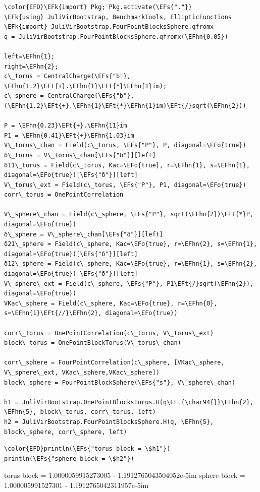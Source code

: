 \documentclass[a4paper]{article}
\numberwithin{equation}{section}
\newcommand{\EFs}[1]{\textcolor{EFs}{#1}} %
\newcommand{\EFk}[1]{\textcolor{EFk}{#1}} %
\newcommand{\EFt}[1]{\textcolor{EFt}{#1}} %
\newcommand{\EFo}[1]{\textcolor{EFo}{#1}} %
\newcommand{\EFhn}[1]{\textcolor{EFhn}{#1}} %
\begin{document}
\begin{Code}
\begin{Verbatim}
\color{EFD}\EFk{import} Pkg; Pkg.activate(\EFs{"."})
\EFk{using} JuliVirBootstrap, BenchmarkTools, EllipticFunctions
\EFk{import} JuliVirBootstrap.FourPointBlocksSphere.qfromx
q = JuliVirBootstrap.FourPointBlocksSphere.qfromx(\EFhn{0.05})

left=\EFhn{1};
right=\EFhn{2};
c\_torus = CentralCharge(\EFs{"b"}, \EFhn{1.2}\EFt{+}.\EFhn{1}\EFt{*}\EFhn{1}im);
c\_sphere = CentralCharge(\EFs{"b"}, (\EFhn{1.2}\EFt{+}.\EFhn{1}\EFt{*}\EFhn{1}im)\EFt{/}sqrt(\EFhn{2}))

P = \EFhn{0.23}\EFt{+}.\EFhn{11}im
P1 = \EFhn{0.41}\EFt{+}\EFhn{1.03}im
V\_torus\_chan = Field(c\_torus, \EFs{"P"}, P, diagonal=\EFo{true})
δ\_torus = V\_torus\_chan[\EFs{"δ"}][left]
δ11\_torus = Field(c\_torus, Kac=\EFo{true}, r=\EFhn{1}, s=\EFhn{1}, diagonal=\EFo{true})[\EFs{"δ"}][left]
V\_torus\_ext = Field(c\_torus, \EFs{"P"}, P1, diagonal=\EFo{true})
corr\_torus = OnePointCorrelation

V\_sphere\_chan = Field(c\_sphere, \EFs{"P"}, sqrt(\EFhn{2})\EFt{*}P, diagonal=\EFo{true})
δ\_sphere = V\_sphere\_chan[\EFs{"δ"}][left]
δ21\_sphere = Field(c\_sphere, Kac=\EFo{true}, r=\EFhn{2}, s=\EFhn{1}, diagonal=\EFo{true})[\EFs{"δ"}][left]
δ12\_sphere = Field(c\_sphere, Kac=\EFo{true}, r=\EFhn{1}, s=\EFhn{2}, diagonal=\EFo{true})[\EFs{"δ"}][left]
V\_sphere\_ext = Field(c\_sphere, \EFs{"P"}, P1\EFt{/}sqrt(\EFhn{2}), diagonal=\EFo{true})
VKac\_sphere = Field(c\_sphere, Kac=\EFo{true}, r=\EFhn{0}, s=\EFhn{1}\EFt{//}\EFhn{2}, diagonal=\EFo{true})

corr\_torus = OnePointCorrelation(c\_torus, V\_torus\_ext)
block\_torus = OnePointBlockTorus(V\_torus\_chan)

corr\_sphere = FourPointCorrelation(c\_sphere, [VKac\_sphere, V\_sphere\_ext, VKac\_sphere,VKac\_sphere])
block\_sphere = FourPointBlockSphere(\EFs{"s"}, V\_sphere\_chan)

h1 = JuliVirBootstrap.OnePointBlocksTorus.H(q\EFt{\char94{}}\EFhn{2}, \EFhn{5}, block\_torus, corr\_torus, left)
h2 = JuliVirBootstrap.FourPointBlocksSphere.H(q, \EFhn{5}, block\_sphere, corr\_sphere, left)
\end{Verbatim}
\end{Code}

\begin{Code}
\begin{Verbatim}
\color{EFD}println(\EFs{"torus block = \$h1"})
println(\EFs{"sphere block = \$h2"})
\end{Verbatim}
\end{Code}
torus block = 1.0000059915273005 - 1.1912765043504052e-5im
sphere block = 1.000005991527301 - 1.1912765042311957e-5im
\end{document}
